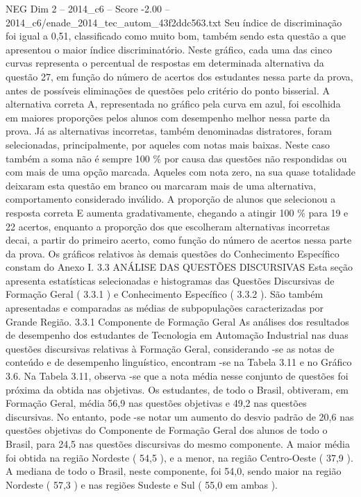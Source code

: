 \begin{textsample}{NEG Dim 2 – 2014\_c6 – Score -2.00 – 2014\_c6/enade\_2014\_tec\_autom\_43f2ddc563.txt}
Seu índice de discriminação foi igual a 0,51, classificado como muito bom, também sendo esta questão a que apresentou o maior índice discriminatório.
Neste gráfico, cada uma das cinco curvas representa o percentual de respostas em determinada alternativa da questão 27, em função do número de acertos dos estudantes nessa parte da prova, antes de possíveis eliminações de questões pelo critério do ponto bisserial.
A alternativa correta A, representada no gráfico pela curva em azul, foi escolhida em maiores proporções pelos alunos com desempenho melhor nessa parte da prova.
Já as alternativas incorretas, também denominadas distratores, foram selecionadas, principalmente, por aqueles com notas mais baixas.
Neste caso também a soma não é sempre 100 \% por causa das questões não respondidas ou com mais de uma opção marcada.
Aqueles com nota zero, na sua quase totalidade deixaram esta questão em branco ou marcaram mais de uma alternativa, comportamento considerado inválido.
A proporção de alunos que selecionou a resposta correta E aumenta gradativamente, chegando a atingir 100 \% para 19 e 22 acertos, enquanto a proporção dos que escolheram alternativas incorretas decai, a partir do primeiro acerto, como função do número de acertos nessa parte da prova.
Os gráficos relativos às demais questões do Conhecimento Específico constam do Anexo I. 3.3 ANÁLISE DAS QUESTÕES DISCURSIVAS Esta seção apresenta estatísticas selecionadas e histogramas das Questões Discursivas de Formação Geral ( 3.3.1 ) e Conhecimento Específico ( 3.3.2 ).
São também apresentadas e comparadas as médias de subpopulações caracterizadas por Grande Região. 3.3.1 Componente de Formação Geral As análises dos resultados de desempenho dos estudantes de Tecnologia em Automação Industrial nas duas questões discursivas relativas à Formação Geral, considerando -se as notas de conteúdo e de desempenho linguístico, encontram -se na Tabela 3.11 e no Gráfico 3.6.
Na Tabela 3.11, observa -se que a nota média nesse conjunto de questões foi próxima da obtida nas objetivas.
Os estudantes, de todo o Brasil, obtiveram, em Formação Geral, média 56,9 nas questões objetivas e 49,2 nas questões discursivas.
No entanto, pode -se notar um aumento do desvio padrão de 20,6 nas questões objetivas do Componente de Formação Geral dos alunos de todo o Brasil, para 24,5 nas questões discursivas do mesmo componente.
A maior média foi obtida na região Nordeste ( 54,5 ), e a menor, na região Centro-Oeste ( 37,9 ).
A mediana de todo o Brasil, neste componente, foi 54,0, sendo maior na região Nordeste ( 57,3 ) e nas regiões Sudeste e Sul ( 55,0 em ambas ).

\end{textsample}
